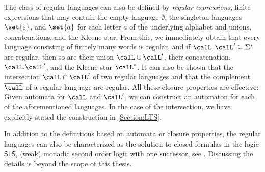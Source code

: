 \documentclass[../../diss.tex]{subfiles}
\begin{document}
The class of regular languages can also be defined by \emph{regular expressions}, finite expressions that may contain the empty language $\emptyset$, the singleton languages $\set{\eps}$, and $\set{a}$ for each letter $a$ of the underlying alphabet and unions, concatenations, and the Kleene star.
From this, we immediately obtain that every language consisting of finitely many words is regular, and if $\calL, \calL' \subseteq \Sigma^*$ are regular, then so are their union $\calL \cup \calL'$, their concatenation, $\calL.\calL'$, and the Kleene star $\calL^*$.
It can also be shown that the intersection $\calL \cap \calL'$ of two regular languages and that the complement $\overline{\calL}$ of a regular language are regular.
All these closure properties are effective:
Given automata for $\calL$ and $\calL'$, we can construct an automaton for each of the aforementioned languages.
In the case of the intersection, we have explicitly stated the construction in \cref{Section:LTS}.

In addition to the definitions based on automata or closure properties, the regular languages can also be characterized as the solution to closed formulas in the logic $\mathsf{S1S}$, (weak) monadic second order logic with one successor, see \eg \cite{KhoussainovN01}.
Discussing the details is beyond the scope of this thesis.
\end{document}
